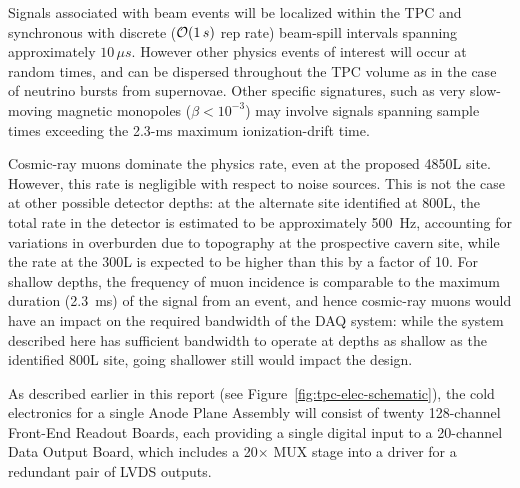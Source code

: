 
Signals associated with beam events will be localized within the 
TPC and synchronous with discrete (${\cal O}(1\,s)$ rep rate) 
beam-spill intervals spanning 
approximately $10\,\mu s$.  
However other physics events of interest will occur at random 
times, and can be dispersed throughout the TPC volume as in the case 
of neutrino bursts from supernovae.  Other specific signatures, such 
as very slow-moving magnetic monopoles ($\beta < 10^{-3}$) may involve 
signals spanning sample times exceeding the 2.3-ms maximum ionization-drift time.  

Cosmic-ray muons dominate the physics rate, even at the proposed 4850L site.  
However, this rate is negligible with respect to noise sources.  This is not 
the case at other possible detector depths:  
at the alternate site identified at 800L, the total 
rate in the detector is estimated to be approximately 500~Hz, accounting 
for variations in overburden due to topography at the prospective cavern 
site, while 
the rate at the 300L is expected to be higher than this by a factor of 10.  
For shallow depths, the frequency of muon incidence is 
comparable to the maximum duration (2.3~ms) of the signal from an event, 
and hence cosmic-ray muons would have an impact on 
the required bandwidth of the DAQ system:  while the system described 
here has sufficient bandwidth to operate at depths as shallow as the 
identified 800L site, going shallower still would impact the design.

As described earlier in this report
(see Figure~\ref{fig:tpc-elec-schematic}), 
the cold electronics for a single Anode Plane Assembly 
will consist of twenty 128-channel Front-End Readout 
Boards, each providing a single digital input to a 20-channel
Data Output Board, which includes a 20$\times$ MUX stage into a  
driver for a redundant pair of LVDS outputs.   

